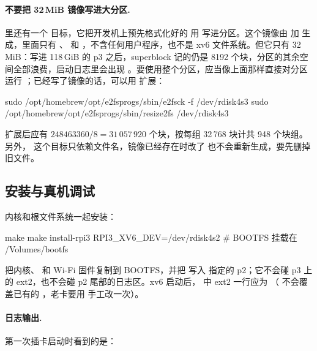 \paragraph{不要把 32\,MiB 镜像写进大分区.}  里还有一个  目标，它把开发机上预先格式化好的  用  写进分区。这个镜像由  加  生成，里面只有 、 和 ，不含任何用户程序，也不是 xv6 文件系统。但它只有 32\,MiB：写进 118\,GiB 的 p3 之后，superblock 记的仍是 8192 个块，分区的其余空间全部浪费，启动日志里会出现 。要使用整个分区，应当像上面那样直接对分区运行 ；已经写了镜像的话，可以用  扩展：

\begin{shcode}
sudo /opt/homebrew/opt/e2fsprogs/sbin/e2fsck -f /dev/rdisk4s3
sudo /opt/homebrew/opt/e2fsprogs/sbin/resize2fs /dev/rdisk4s3
\end{shcode}

扩展后应有 $248463360 / 8 = 31\,057\,920$ 个块，按每组 32\,768 块计共 948 个块组。另外， 这个目标只依赖文件名，镜像已经存在时改了  也不会重新生成，要先删掉旧文件。

\subsection{安装与真机调试}
\label{sec:ext2-install}

内核和根文件系统一起安装：

\begin{shcode}
make
make install-rpi3 RPI3_XV6_DEV=/dev/rdisk4s2   # BOOTFS 挂载在 /Volumes/bootfs
\end{shcode}

 把内核、 和 Wi-Fi 固件复制到 BOOTFS，并把  写入  指定的 p2；它不会碰 p3 上的 ext2，也不会碰 p2 尾部的日志区。xv6 启动后， 中 ext2 一行应为 （ 不会覆盖已有的 ，老卡要用  手工改一次）。

\paragraph{日志输出.} 第一次插卡启动时看到的是：


